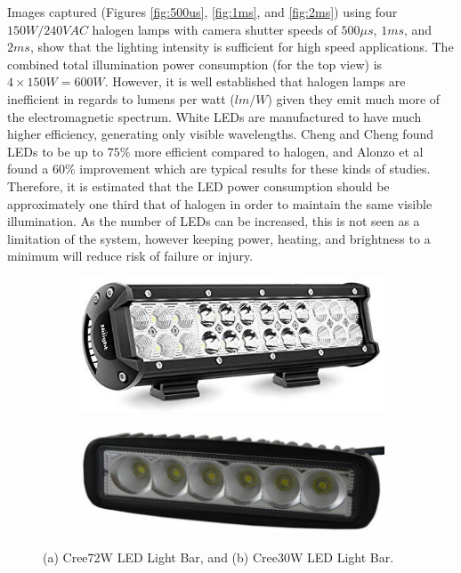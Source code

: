 \documentclass[fleqn,twoside,12pt]{report}
\begin{document}
Images captured (Figures \ref{fig:500us}, \ref{fig:1ms}, and \ref{fig:2ms}) using four $150W/240VAC$ halogen lamps with camera shutter speeds of $500\mu s$, $1ms$, and $2ms$, show that the lighting intensity is sufficient for high speed applications. The combined total illumination power consumption (for the top view) is $4\times 150W = 600W$. However, it is well established that halogen lamps are inefficient in regards to lumens per watt ($lm/W$) given they emit much more of the electromagnetic spectrum. White LEDs are manufactured to have much higher efficiency, generating only visible wavelengths. Cheng and Cheng \cite{cheng} found LEDs to be up to $75\%$ more efficient compared to halogen, and Alonzo et al \cite{alonzo} found a $60\%$ improvement which are typical results for these kinds of studies. Therefore, it is estimated that the LED power consumption should be approximately one third that of halogen in order to maintain the same visible illumination. As the number of LEDs can be increased, this is not seen as a limitation of the system, however keeping power, heating, and brightness to a minimum will reduce risk of failure or injury. 


\begin{figure}[h]
	\centering
	\begin{subfigure}{0.5\textwidth}
		\centering
		\includegraphics[width=\linewidth]{LED_bar.png}
		\caption{}
		\label{fig:LED_bar}
	\end{subfigure}%
	\begin{subfigure}{.5\textwidth}
		\centering
		\includegraphics[width=\linewidth]{LED_30w.png}
		\caption{}
		\label{fig:LED_30w}
	\end{subfigure}%
	\caption{(a) Cree\textregistered 72W LED Light Bar, and (b) Cree\textregistered 30W LED Light Bar.}
	\label{}
\end{figure} 
\end{document}
